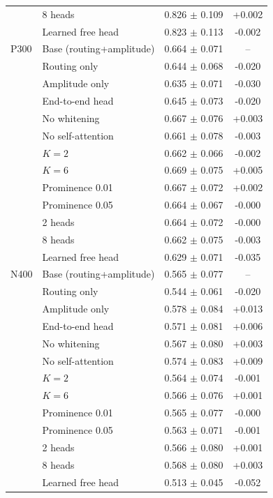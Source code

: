 \begin{table}[t]
\begin{tabular}{llcc}
 & 8 heads & 0.826 $\pm$ 0.109 & +0.002 \\
 & Learned free head & 0.823 $\pm$ 0.113 & -0.002 \\
\midrule
P300 & Base (routing+amplitude) & 0.664 $\pm$ 0.071 & -- \\
 & Routing only & 0.644 $\pm$ 0.068 & -0.020 \\
 & Amplitude only & 0.635 $\pm$ 0.071 & -0.030 \\
 & End-to-end head & 0.645 $\pm$ 0.073 & -0.020 \\
 & No whitening & 0.667 $\pm$ 0.076 & +0.003 \\
 & No self-attention & 0.661 $\pm$ 0.078 & -0.003 \\
 & $K=2$ & 0.662 $\pm$ 0.066 & -0.002 \\
 & $K=6$ & 0.669 $\pm$ 0.075 & +0.005 \\
 & Prominence 0.01 & 0.667 $\pm$ 0.072 & +0.002 \\
 & Prominence 0.05 & 0.664 $\pm$ 0.067 & -0.000 \\
 & 2 heads & 0.664 $\pm$ 0.072 & -0.000 \\
 & 8 heads & 0.662 $\pm$ 0.075 & -0.003 \\
 & Learned free head & 0.629 $\pm$ 0.071 & -0.035 \\
\midrule
N400 & Base (routing+amplitude) & 0.565 $\pm$ 0.077 & -- \\
 & Routing only & 0.544 $\pm$ 0.061 & -0.020 \\
 & Amplitude only & 0.578 $\pm$ 0.084 & +0.013 \\
 & End-to-end head & 0.571 $\pm$ 0.081 & +0.006 \\
 & No whitening & 0.567 $\pm$ 0.080 & +0.003 \\
 & No self-attention & 0.574 $\pm$ 0.083 & +0.009 \\
 & $K=2$ & 0.564 $\pm$ 0.074 & -0.001 \\
 & $K=6$ & 0.566 $\pm$ 0.076 & +0.001 \\
 & Prominence 0.01 & 0.565 $\pm$ 0.077 & -0.000 \\
 & Prominence 0.05 & 0.563 $\pm$ 0.071 & -0.001 \\
 & 2 heads & 0.566 $\pm$ 0.080 & +0.001 \\
 & 8 heads & 0.568 $\pm$ 0.080 & +0.003 \\
 & Learned free head & 0.513 $\pm$ 0.045 & -0.052 \\
\bottomrule
\end{tabular}
\end{table}
